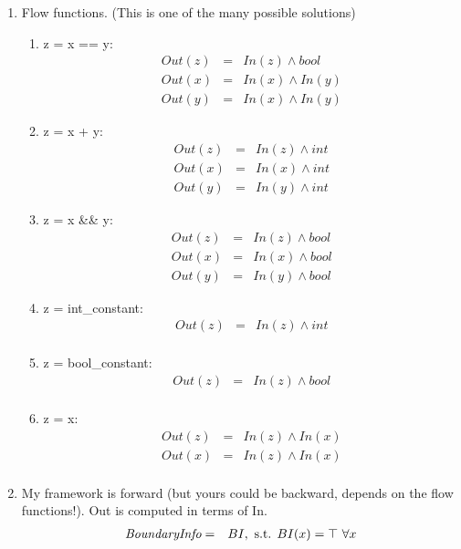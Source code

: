\documentclass[12pt]{article}
\begin{document}
\begin{enumerate}
{\begin{enumerate}
  represents conflicting types inferred (more than one type
  for a variable).
\item Flow functions. (This is one of the many possible solutions)
  \begin{enumerate}
  \item z = x == y:
    \begin{eqnarray*}
      Out(z) &=& In(z) \wedge bool \\
      Out(x) &=& In(x) \wedge In(y) \\
      Out(y) &=& In(x) \wedge In(y) 
    \end{eqnarray*}

  \item z = x + y:
    \begin{eqnarray*}
      Out(z) &=& In(z) \wedge int \\
      Out(x) &=& In(x) \wedge int \\
      Out(y) &=& In(y) \wedge int 
    \end{eqnarray*}

  \item z = x \&\& y:
    \begin{eqnarray*}
      Out(z) &=& In(z) \wedge bool \\
      Out(x) &=& In(x) \wedge bool \\
      Out(y) &=& In(y) \wedge bool
    \end{eqnarray*}

  \item z = int\_constant:
    \begin{eqnarray*}
      Out(z) &=& In(z) \wedge int \\
    \end{eqnarray*}

  \item z = bool\_constant:
    \begin{eqnarray*}
      Out(z) &=& In(z) \wedge bool \\
    \end{eqnarray*}

  \item z = x:
    \begin{eqnarray*}
      Out(z) &=& In(z) \wedge In(x)  \\
      Out(x) &=& In(z) \wedge In(x)  \\
    \end{eqnarray*}
  \end{enumerate}
\item My framework is forward (but yours could be backward,
  depends on the flow functions!). Out is computed in terms
  of In. 
    \begin{eqnarray*}
      \mbox{\em BoundaryInfo} &=& BI, \mbox{ s.t. } BI(x) =
      \top\       \forall x \\
    \end{eqnarray*} 
\end{enumerate}
}



\end{enumerate}
\end{document}

